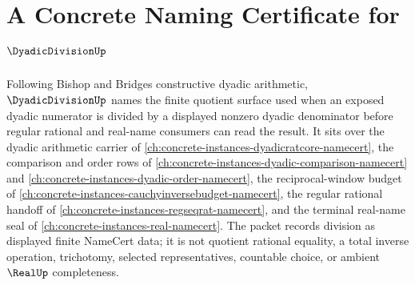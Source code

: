 \chapter{A Concrete Naming Certificate for $\DyadicDivisionUp$}
\label{ch:concrete-instances-dyadic-division-namecert}

Following Bishop and Bridges constructive dyadic arithmetic, $\DyadicDivisionUp$ names the finite quotient surface used when an exposed dyadic numerator is divided by a displayed nonzero dyadic denominator before regular rational and real-name consumers can read the result. It sits over the dyadic arithmetic carrier of \autoref{ch:concrete-instances-dyadicratcore-namecert}, the comparison and order rows of \autoref{ch:concrete-instances-dyadic-comparison-namecert} and \autoref{ch:concrete-instances-dyadic-order-namecert}, the reciprocal-window budget of \autoref{ch:concrete-instances-cauchyinversebudget-namecert}, the regular rational handoff of \autoref{ch:concrete-instances-regseqrat-namecert}, and the terminal real-name seal of \autoref{ch:concrete-instances-real-namecert}. The packet records division as displayed finite NameCert data; it is not quotient rational equality, a total inverse operation, trichotomy, selected representatives, countable choice, or ambient $\RealUp$ completeness.


